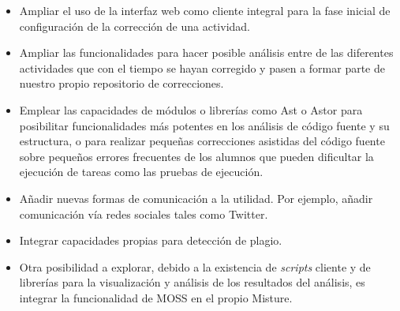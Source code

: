 \begin{itemize}
\item Ampliar el uso de la interfaz web como cliente integral para la fase inicial de configuración de la corrección de una actividad.

\item Ampliar las funcionalidades para hacer posible análisis entre de las diferentes actividades que con el tiempo se hayan corregido y pasen a formar parte de nuestro propio repositorio de correcciones.

\item Emplear las capacidades de módulos o librerías como Ast o Astor para posibilitar funcionalidades más potentes en los análisis de código fuente y su estructura, o para realizar pequeñas correcciones asistidas del código fuente sobre pequeños errores frecuentes de los alumnos que pueden dificultar la ejecución de tareas como las pruebas de ejecución.

\item Añadir nuevas formas de comunicación a la utilidad. Por ejemplo, añadir comunicación vía redes sociales tales como Twitter.

\item Integrar capacidades propias para detección de plagio.

\item Otra posibilidad a explorar, debido a la existencia de \textit{scripts} cliente y de librerías para la visualización y análisis de los resultados del análisis, es integrar la funcionalidad de MOSS en el propio Misture.
\end{itemize}
